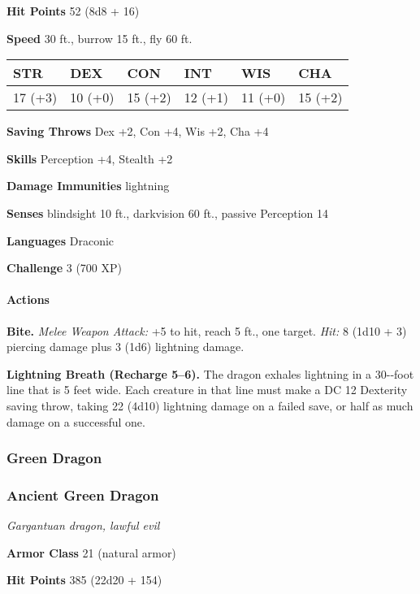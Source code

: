 \documentclass[
]{article}
\begin{document}
\textbf{Hit Points} 52 (8d8 + 16)

\textbf{Speed} 30 ft., burrow 15 ft., fly 60 ft.

\begin{longtable}[]{@{}llllll@{}}
\toprule
STR & DEX & CON & INT & WIS & CHA\tabularnewline
\midrule
\endhead
17 (+3) & 10 (+0) & 15 (+2) & 12 (+1) & 11 (+0) & 15 (+2)\tabularnewline
\bottomrule
\end{longtable}

\textbf{Saving Throws} Dex +2, Con +4, Wis +2, Cha +4

\textbf{Skills} Perception +4, Stealth +2

\textbf{Damage Immunities} lightning

\textbf{Senses} blindsight 10 ft., darkvision 60 ft., passive Perception
14

\textbf{Languages} Draconic

\textbf{Challenge} 3 (700 XP)

\hypertarget{actions-30}{%
\paragraph{Actions}\label{actions-30}}

\textbf{Bite.} \emph{Melee Weapon Attack:} +5 to hit, reach 5 ft., one
target. \emph{Hit:} 8 (1d10 + 3) piercing damage plus 3 (1d6) lightning
damage.

\textbf{Lightning Breath (Recharge 5--6).} The dragon exhales lightning
in a 30-­‐foot line that is 5 feet wide. Each creature in that line must
make a DC 12 Dexterity saving throw, taking 22 (4d10) lightning damage
on a failed save, or half as much damage on a successful one.

\hypertarget{green-dragon}{%
\subsubsection{Green Dragon}\label{green-dragon}}

\hypertarget{ancient-green-dragon}{%
\subsubsection{Ancient Green Dragon}\label{ancient-green-dragon}}

\emph{Gargantuan dragon, lawful evil}

\textbf{Armor Class} 21 (natural armor)

\textbf{Hit Points} 385 (22d20 + 154)
\end{document}

